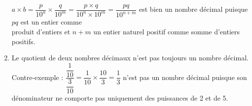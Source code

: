 \begin{enumerate}
        $a\times b =\dfrac{p}{10^n}\times\dfrac{q}{10^m} =\dfrac{p\times q}{10^n\times10^m} =\dfrac{pq}{10^{n+m}}$ est bien un nombre décimal puisque $pq$ est un entier comme \\ [1mm]
        produit d'entiers et $n+m$ un entier naturel positif comme somme d'entiers positifs.
      \item {\blue Le quotient de deux nombres décimaux n'est pas toujours un nombre décimal}. \\
         Contre-exemple : $\dfrac{\dfrac{1}{10}}{\dfrac{3}{10}} =\dfrac{1}{10}\times\dfrac{10}{3} =\dfrac13$ n'est pas un nombre décimal puisque son dénominateur ne comporte pas uniquement des puissances de 2 et de 5.
   \end{enumerate}

